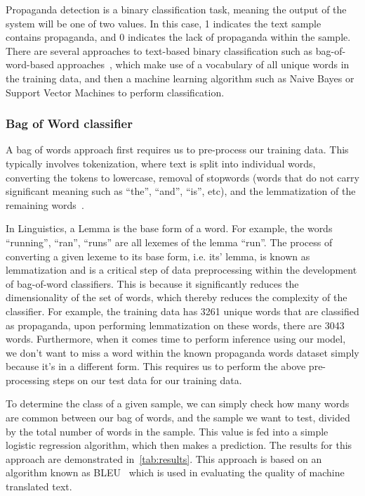 \documentclass[twocolumn]{article}
\begin{document}
Propaganda detection is a binary classification task, meaning the output of the system will be one of two values. In this case, 1 indicates the text sample contains propaganda, and 0 indicates the lack of propaganda within the sample. There are several approaches to text-based binary classification such as bag-of-word-based approaches~\cite{qader2019overview}, which make use of a vocabulary of all unique words in the training data, and then a machine learning algorithm such as Naive Bayes or Support Vector Machines to perform classification.

\subsubsection{Bag of Word classifier}

A bag of words approach first requires us to pre-process our training data. This typically involves tokenization, where text is split into individual words, converting the tokens to lowercase, removal of stopwords (words that do not carry significant meaning such as ``the'', ``and'', ``is'', etc), and the lemmatization of the remaining words~\cite{qader2019overview}. 

In Linguistics, a Lemma is the base form of a word. For example, the words ``running'', ``ran'', ``runs'' are all lexemes of the lemma ``run''. The process of converting a given lexeme to its base form, i.e. its' lemma, is known as lemmatization and is a critical step of data preprocessing within the development of bag-of-word classifiers. This is because it significantly reduces the dimensionality of the set of words, which thereby reduces the complexity of the classifier. For example, the training data has 3261 unique words that are classified as propaganda, upon performing lemmatization on these words, there are 3043 words. Furthermore, when it comes time to perform inference using our model, we don't want to miss a word within the known propaganda words dataset simply because it's in a different form. This requires us to perform the above pre-processing steps on our test data for our training data. 

To determine the class of a given sample, we can simply check how many words are common between our bag of words, and the sample we want to test, divided by the total number of words in the sample. This value is fed into a simple logistic regression algorithm, which then makes a prediction. The results for this approach are demonstrated in~\autoref{tab:results}. This approach is based on an algorithm known as BLEU~\cite{papineni2002bleu} which is used in evaluating the quality of machine translated text. 
\end{document}
